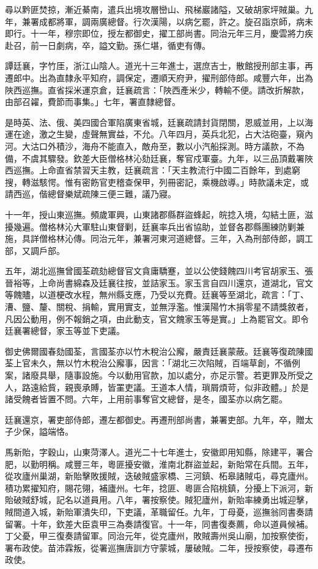 \begin{pinyinscope}
尋以黔匪焚掠，漸近綦南，遣兵出境攻層巒山、飛梯巖諸隘，又破胡家坪賊巢。九年，兼署成都將軍，調兩廣總督。行次漢陽，以病乞罷，許之。旋召詣京師，病未即行。十一年，穆宗即位，授左都御史，擢工部尚書。同治元年三月，慶雲將力疾赴召，前一日劇病，卒，謚文勤。孫仁堪，循吏有傳。

譚廷襄，字竹厓，浙江山陰人。道光十三年進士，選庶吉士，散館授刑部主事，再遷郎中。出為直隸永平知府，調保定，遷順天府尹，擢刑部侍郎。咸豐六年，出為陜西巡撫。直省採米運京倉，廷襄疏言：「陜西產米少，轉輸不便。請改折解款，由部召糴，費節而事集。」七年，署直隸總督。

是時英、法、俄、美四國合軍陷廣東省城，廷襄疏請封貨閉關，恩威並用，上以海運在途，激之生變，虛聲無實益，不允。八年四月，英兵北犯，占大沽砲臺，窺內河。大沽口外積沙，海舟不能直入，敵舟至，數以小汽船採測。時方議款，不為備，不虞其驟發。欽差大臣僧格林沁劾廷襄，奪官戍軍臺。九年，以三品頂戴署陜西巡撫。上命直省禁習天主教，廷襄疏言：「天主教流行中國二百餘年，到處窮搜，轉滋駭愕。惟有密飭官吏稽查保甲，列冊密記，乘機啟導。」時款議未定，或請西巡，偕總督樂斌疏陳三便三難，議乃寢。

十一年，授山東巡撫。頻歲軍興，山東諸郡縣群盜蜂起，皖捻入境，勾結土匪，滋擾幾遍。僧格林沁大軍駐山東督剿，廷襄率兵出省協助，並督各郡縣團練防剿兼施，具詳僧格林沁傳。同治元年，兼署河東河道總督。三年，入為刑部侍郎，調工部，又調戶部。

五年，湖北巡撫曾國荃疏劾總督官文貪庸驕蹇，並以公使錢餽四川考官胡家玉、張晉裕等，上命尚書綿森及廷襄往按，並詰家玉。家玉言自四川還京，道湖北，官文等餽贐，以道梗改水程，無州縣支應，乃受以充費。廷襄等至湖北，疏言：「丁、漕、鹽、釐、關稅、捐輸，實用實支，並無浮濫。惟漢陽竹木捐零星不請獎敘者，凡因公動用，例不報銷之項，由此動支，官文餽家玉等是實。」上為罷官文。即令廷襄署總督，家玉等並下吏議。

御史佛爾國春劾國荃，言國荃亦以竹木稅治公廨，嚴責廷襄蒙蔽。廷襄等復疏陳國荃上官未久，無以竹木稅治公廨事，因言：「湖北三次陷賊，百端草創，不循例案，諸廢具舉，隨事設施。今以動用官款，加以處分，亦足示警。若更罪及所受之人，路遠給貲，親喪承賻，皆罣吏議。王道本人情，瑣屑煩苛，似非政體。」於是諸受餽者皆置不問。六年，上用前事奪官文總督，是冬，國荃亦以病乞罷。

廷襄還京，署吏部侍郎，遷左都御史。再遷刑部尚書，兼署吏部。九年，卒，贈太子少保，謚端恪。

馬新貽，字穀山，山東菏澤人。道光二十七年進士，安徽即用知縣，除建平，署合肥，以勤明稱。咸豐三年，粵匪擾安徽，淮南北群盜並起，新貽常在兵間。五年，從攻廬州巢湖，新貽擊敗援賊，迭破賊盛家橋、三河鎮、柘皋諸賊屯，尋克廬州。積功累擢知府，賜花翎，補廬州。七年，捻匪、粵匪合陷桃鎮，分擾上下派河，新貽破賊舒城，記名以道員用。八年，署按察使。賊犯廬州，新貽率練勇出城迎擊，賊間道入城，新貽軍潰失印，下吏議，革職留任。九年，丁母憂，巡撫翁同書奏請留署。十年，欽差大臣袁甲三為奏請復官。十一年，同書復奏薦，命以道員候補。丁父憂，甲三復奏請留軍。同治元年，從克廬州，敗賊壽州吳山廟，加按察使銜，署布政使。苗沛霖叛，從署巡撫唐訓方守蒙城，屢破賊。二年，授按察使，尋遷布政使。


\end{pinyinscope}
